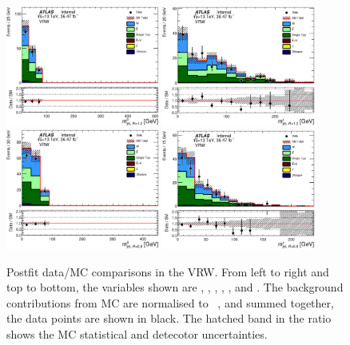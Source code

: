\begin{figure}[!htb]
  \centering
  \includegraphics[width=0.45\textwidth]{figures/wJets/postfit/AntiKt12M_0__VRW.eps}
  \includegraphics[width=0.45\textwidth]{figures/wJets/postfit/AntiKt12M_1__VRW.eps}
  \includegraphics[width=0.45\textwidth]{figures/wJets/postfit/AntiKt8M_0__VRW.eps}
  \includegraphics[width=0.45\textwidth]{figures/wJets/postfit/AntiKt8M_1__VRW.eps}
  \caption{Postfit data/MC comparisons in the VRW. From left to right and top to bottom, the variables shown are \met, \mtbmin, \mtbmax, \mantikttwelvezero, \mantikttwelveone, and \mantikteightzero. The background contributions from MC are normalised to \intlumi\ \ifb, and summed together, the data points are shown in black. The hatched band in the ratio shows the MC statistical and detecotor uncertainties.}
  \label{fig:VRWMasses}
\end{figure}


